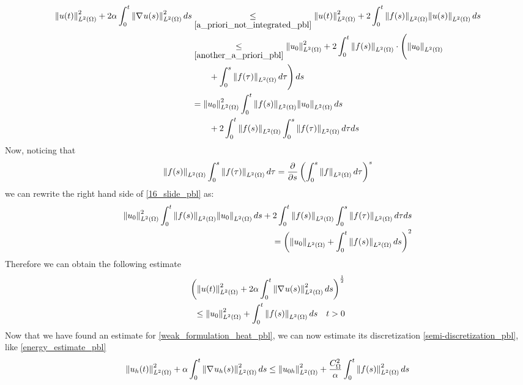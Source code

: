 \begin{equation}
    \begin{aligned}
        \norm{u(t)}_{L^2(\Omega)}^2 + 2\alpha \int_0^t \norm{\nabla\mspace{1mu} u(s)}_{L^2(\Omega)}^2 \, ds 
        &\underset{\eqref{a_priori_not_integrated_pbl}}{\leq} \norm{u(t)}_{L^2(\Omega)}^2 + 2\int_0^t \norm{f(s)}_{L^2(\Omega)}\norm{u(s)}_{L^2(\Omega)} \, ds \\
        &\underset{\eqref{another_a_priori_pbl}}{\leq} \norm{u_0}_{L^2(\Omega)}^2 + 2\int_0^t \norm{f(s)}_{L^2(\Omega)} \cdot \Bigg( \norm{u_0}_{L^2(\Omega)} \\
        &\qquad + \int_0^s \norm{f(\tau)}_{L^2(\Omega)} \, d\tau \Bigg) \, ds \\
        &= \norm{u_0}_{L^2(\Omega)}^2 \int_0^t \norm{f(s)}_{L^2(\Omega)}\norm{u_0}_{L^2(\Omega)}\, ds \\
        &\qquad+ 2 \int_0^t \norm{f(s)}_{L^2(\Omega)}\int_0^s \norm{f(\tau)}_{L^2(\Omega)} \, d\tau ds
    \end{aligned}
    \label{16_slide_pbl}
\end{equation}
Now, noticing that 
\[
    \ltwonorm{f(s)} \int_0^s \ltwonorm{f(\tau)} \, d\tau = \pderivative{s} \left( \int_0^s \ltwonorm{f} \, d\tau \right)^s
\]
we can rewrite the right hand side of \eqref{16_slide_pbl} as:
\begin{equation*}
    \begin{split}
        \norm{u_0}_{L^2(\Omega)}^2 \int_0^t \norm{f(s)}_{L^2(\Omega)}\norm{u_0}_{L^2(\Omega)}\, ds+ 2 \int_0^t \norm{f(s)}_{L^2(\Omega)}\int_0^s \norm{f(\tau)}_{L^2(\Omega)} \, d\tau ds \\
        = \left( \norm{u_0}_{L^2(\Omega)} +\int_0^t \norm{f(s)}_{L^2(\Omega)} \, ds \right)^2
    \end{split}
\end{equation*}
Therefore we can obtain the following estimate 
\begin{equation}
    \begin{split}
        \left( \norm{u(t)}_{L^2(\Omega)}^2 + 2\alpha \int_0^t \norm{\nabla\mspace{1mu} u(s)}_{L^2(\Omega)}^2 \, ds \right)^{\frac{1}{2}} \\
        \leq \norm{u_0}_{L^2(\Omega)}^2 + \int_0^t \norm{f(s)}_{L^2(\Omega)} \, ds \quad t >0
    \end{split}
    \label{hopefully_last_estimate_pbl}
\end{equation}
Now that we have found an estimate for \eqref{weak_formulation_heat_pbl}, we can now estimate its discretization \eqref{semi-discretization_pbl}, like \eqref{energy_estimate_pbl}
\begin{equation}
    \norm{u_h(t)}_{L^2(\Omega)}^2 +\alpha \int_0^t \norm{\nabla\mspace{1mu} u_h(s)}_{L^2(\Omega)}^2 \, ds \leq \norm{u_{0h}}_{L^2(\Omega)}^2 + \frac{C_\Omega^2}{\alpha} \int_0^t \norm{f(s)}_{L^2(\Omega)}^2 \, ds
    \label{energy_est_galerkin_pbl}
\end{equation}
